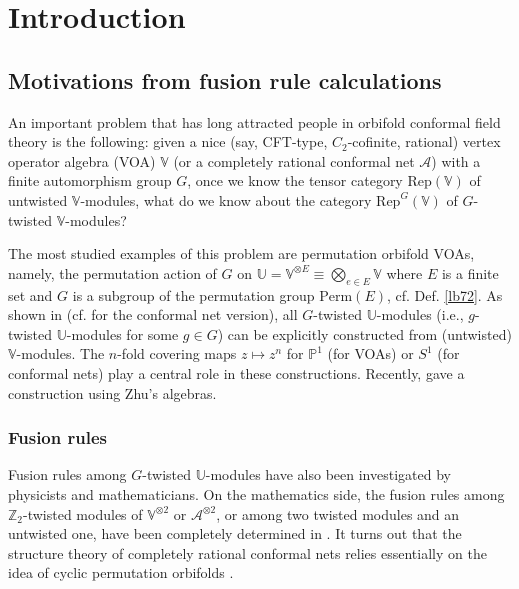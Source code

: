 \documentclass[11pt,b5paper,notitlepage]{article}
\theoremstyle{definition}
\theoremstyle{plain}
\newcommand{\mc}{\mathcal}
\newcommand{\Rep}{\mathrm{Rep}}
\newcommand{\Vbb}{\mathbb V}
\newcommand{\Ubb}{\mathbb U}
\newcommand{\Zbb}{\mathbb Z}
\newcommand{\Pbb}{\mathbb P}
\newcommand{\Perm}{\mathrm{Perm}}
\numberwithin{equation}{subsection}
\begin{document}
	
\newpage




\section{Introduction}

\subsection{Motivations from fusion rule calculations}
An important problem that has long attracted people in orbifold conformal field theory is the following: given a nice (say, CFT-type, $C_2$-cofinite,  rational) vertex operator algebra (VOA) $\Vbb$ (or a completely rational conformal net $\mc A$) with a finite automorphism group $G$, once we know the tensor category $\Rep(\Vbb)$ of untwisted $\Vbb$-modules, what do we know about   the category $\Rep^G(\Vbb)$ of $G$-twisted $\Vbb$-modules?

The most studied examples of this problem are permutation orbifold VOAs, namely, the permutation action of $G$ on $\Ubb=\Vbb^{\otimes E}\equiv\bigotimes_{e\in E}\Vbb$ where $E$ is a finite set and $G$ is a subgroup of the permutation group $\Perm(E)$, cf. Def. \ref{lb72}. As shown in \cite{BHS98,BDM02} (cf. \cite{LX04,KLX05} for the conformal net version), all $G$-twisted $\Ubb$-modules (i.e., $g$-twisted $\Ubb$-modules for some $g\in G$) can be explicitly constructed from (untwisted) $\Vbb$-modules. The $n$-fold covering maps $z\mapsto z^n$ for $\Pbb^1$ (for VOAs) or $S^1$ (for conformal nets) play a central role in these constructions. Recently, \cite{DXY22} gave a construction using Zhu's algebras. 


\subsubsection*{Fusion rules}

Fusion rules among $G$-twisted $\Ubb$-modules have also been investigated by physicists \cite{BHS98,Ban98,Ban02} and mathematicians. On the mathematics side, the fusion rules among $\Zbb_2$-twisted modules of $\Vbb^{\otimes 2}$ or $\mc A^{\otimes 2}$, or among two twisted modules and an untwisted one, have been completely determined in \cite{LX04,KLX05,DLXY24}. It turns out that the structure theory of completely rational conformal nets relies essentially on the idea of  cyclic permutation orbifolds \cite{KLM01,LX04}.
\end{document}
